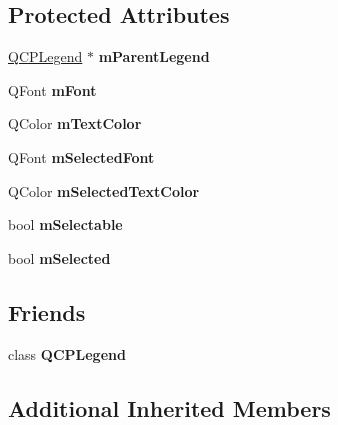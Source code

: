 \subsection*{Protected Attributes}
\begin{DoxyCompactItemize}
\item 
\mbox{\label{classQCPAbstractLegendItem_aafcd9fc6fcb10f4a8d46037011afafe8}} 
\hyperlink{classQCPLegend}{Q\+C\+P\+Legend} $\ast$ {\bfseries m\+Parent\+Legend}
\item 
\mbox{\label{classQCPAbstractLegendItem_ae916a78ac0d2a60e20a17ca2f24f9754}} 
Q\+Font {\bfseries m\+Font}
\item 
\mbox{\label{classQCPAbstractLegendItem_a974b21e9930227d281344bd2242d289d}} 
Q\+Color {\bfseries m\+Text\+Color}
\item 
\mbox{\label{classQCPAbstractLegendItem_ab971df604306b192875a7d097feb1e21}} 
Q\+Font {\bfseries m\+Selected\+Font}
\item 
\mbox{\label{classQCPAbstractLegendItem_a4965c13854d970b24c284f0a4f005fbd}} 
Q\+Color {\bfseries m\+Selected\+Text\+Color}
\item 
\mbox{\label{classQCPAbstractLegendItem_aa84029f57b1b32f642fb7db63c3fc2c2}} 
bool {\bfseries m\+Selectable}
\item 
\mbox{\label{classQCPAbstractLegendItem_ae58ebebbd0c36cc6fe897483369984d2}} 
bool {\bfseries m\+Selected}
\end{DoxyCompactItemize}
\subsection*{Friends}
\begin{DoxyCompactItemize}
\item 
\mbox{\label{classQCPAbstractLegendItem_a8429035e7adfbd7f05805a6530ad5e3b}} 
class {\bfseries Q\+C\+P\+Legend}
\end{DoxyCompactItemize}
\subsection*{Additional Inherited Members}


